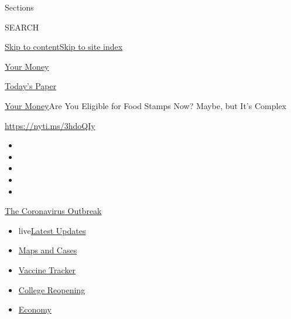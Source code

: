Sections

SEARCH

\protect\hyperlink{site-content}{Skip to
content}\protect\hyperlink{site-index}{Skip to site index}

\href{https://www.nytimes3xbfgragh.onion/section/your-money}{Your Money}

\href{https://myaccount.nytimes3xbfgragh.onion/auth/login?response_type=cookie\&client_id=vi}{}

\href{https://www.nytimes3xbfgragh.onion/section/todayspaper}{Today's
Paper}

\href{/section/your-money}{Your Money}\textbar{}Are You Eligible for
Food Stamps Now? Maybe, but It's Complex

\url{https://nyti.ms/3hdoQIy}

\begin{itemize}
\item
\item
\item
\item
\item
\end{itemize}

\href{https://www.nytimes3xbfgragh.onion/news-event/coronavirus?action=click\&pgtype=Article\&state=default\&region=TOP_BANNER\&context=storylines_menu}{The
Coronavirus Outbreak}

\begin{itemize}
\tightlist
\item
  live\href{https://www.nytimes3xbfgragh.onion/2020/08/03/world/coronavirus-covid-19.html?action=click\&pgtype=Article\&state=default\&region=TOP_BANNER\&context=storylines_menu}{Latest
  Updates}
\item
  \href{https://www.nytimes3xbfgragh.onion/interactive/2020/us/coronavirus-us-cases.html?action=click\&pgtype=Article\&state=default\&region=TOP_BANNER\&context=storylines_menu}{Maps
  and Cases}
\item
  \href{https://www.nytimes3xbfgragh.onion/interactive/2020/science/coronavirus-vaccine-tracker.html?action=click\&pgtype=Article\&state=default\&region=TOP_BANNER\&context=storylines_menu}{Vaccine
  Tracker}
\item
  \href{https://www.nytimes3xbfgragh.onion/2020/08/02/us/covid-college-reopening.html?action=click\&pgtype=Article\&state=default\&region=TOP_BANNER\&context=storylines_menu}{College
  Reopening}
\item
  \href{https://www.nytimes3xbfgragh.onion/live/2020/08/03/business/stock-market-today-coronavirus?action=click\&pgtype=Article\&state=default\&region=TOP_BANNER\&context=storylines_menu}{Economy}
\end{itemize}

